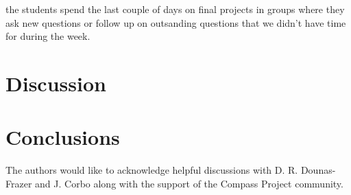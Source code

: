 \documentclass[aps,pre,10pt,superscriptaddress,showpacs,amsmath,amssymb,nofootinbib]{revtex4-1}
\begin{document}
the students spend the last couple of days on final projects in groups where they ask new questions or follow up on outsanding questions that we didn't have time for during the week.  


\section{Discussion}




\section{Conclusions}



\acknowledgments The authors would like to acknowledge helpful discussions with D. R. Dounas-Frazer and J. Corbo along with the support of the Compass Project community. 


\end{document}
